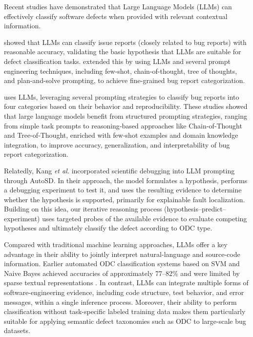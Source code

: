 Recent studies have demonstrated that Large Language Models (LLMs) can effectively classify software defects when provided with relevant contextual information.

\citep{colavito2024llm} showed that LLMs can classify issue reports (closely related to bug reports) with reasonable accuracy, validating the basic hypothesis that LLMs are suitable for defect classification tasks. \citep{koyuncu2025exploring} extended this by using LLMs and several prompt engineering techniques, including few-shot, chain-of-thought, tree of thoughts, and plan-and-solve prompting, to achieve fine-grained bug report categorization. 

\citep{li2024knowbug, du2024llm} uses LLMs, leveraging several prompting strategies to classify bug reports into four categories based on their behavior and reproducibility. These studies showed that large language models benefit from structured prompting strategies, ranging from simple task prompts to reasoning‑based approaches like Chain‑of‑Thought and Tree‑of‑Thought, enriched with few‑shot examples and domain knowledge integration, to improve accuracy, generalization, and interpretability of bug report categorization.

Relatedly, Kang \textit{et al.} \citep{kang2023autosd} incorporated scientific debugging into LLM prompting through AutoSD. In their approach, the model formulates a hypothesis, performs a debugging experiment to test it, and uses the resulting evidence to determine whether the hypothesis is supported, primarily for explainable fault localization. Building on this idea, our iterative reasoning process (hypothesis--predict--experiment) uses targeted probes of the available evidence to evaluate competing hypotheses and ultimately classify the defect according to ODC type.

Compared with traditional machine learning approaches, LLMs offer a key advantage in their ability to jointly interpret natural-language and source-code information. Earlier automated ODC classification systems based on SVM and Naive Bayes achieved accuracies of approximately 77--82\% and were limited by sparse textual representations \citep{huang2011autoodc, thung2012automatic}. In contrast, LLMs can integrate multiple forms of software-engineering evidence, including code structure, test behavior, and error messages, within a single inference process. Moreover, their ability to perform classification without task-specific labeled training data makes them particularly suitable for applying semantic defect taxonomies such as ODC to large-scale bug datasets.

